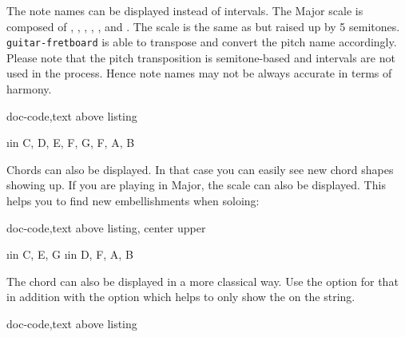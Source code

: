 \documentclass[a4paper]{article}
\newcommand{\pkg}[1]{\texttt{#1}}
\begin{document}
The note names can be displayed instead of intervals. The \pF Major scale is
composed of \pF, \pG, \pA, \pBb, \pC, \pD and \pE. The \pF scale is the same
as \pC but raised up by 5 semitones. \pkg{guitar-fretboard} is able to
transpose and convert the pitch name accordingly. Please note that the pitch
transposition is semitone-based and intervals are not used in the
process. Hence note names may not be always accurate in terms of harmony.

\begin{tcblisting}{doc-code,text above listing}
  \begin{fretboard}[frets before = 2, frets after = 2,
      transpose = 5,
      transpose pitch,
      title = {\pF Major scale\\\Large (\pF, \pG, \pA, \pBb, \pC, \pD, \pE)},
      scale=0.35,
      fret numbers]
    \foreach \i in { C, D, E, F, G, F, A, B} {
      \FBnote[split]{\i}
    }
  \end{fretboard}
\end{tcblisting}



Chords can also be displayed. In that case you can easily see new \pC chord
shapes showing up. If you are playing in \pC Major, the scale can also be
displayed. This helps you to find new embellishments when soloing:

\begin{tcblisting}{doc-code,text above listing, center upper}
  \begin{fretboard}[frets before = 2, frets after = 2,
      title = {\pC Chord (and \pC major scale)},
      scale = 0.35,
      fret numbers]
    \foreach \i in {C, E, G} {
      \FBnote{\i}
    }
    \foreach \i in {D, F, A, B} {
      \FBnote[shade]{\i}
    }
  \end{fretboard}
\end{tcblisting}

The \pC chord can also be displayed in a more classical way. Use the
 option for that in addition with the  option which
helps to only show the \pG on the  string.

\begin{tcblisting}{doc-code,text above listing}
  \begin{fretboard}[frets min = 0, frets max = 3, fret numbers,
      title = {\pC}, chord, scale=0.35]
      
  \end{fretboard}
\end{tcblisting}
\end{document}
